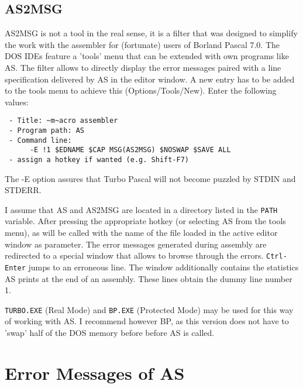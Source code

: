 \documentclass[12pt,twoside]{report}
\newcommand{\tty}[1]{{\tt #1}}
\begin{document}

\section{AS2MSG}

AS2MSG is not a tool in the real sense, it is a filter that was
designed to simplify the work with the assembler for (fortunate)
users of Borland Pascal 7.0.  The DOS IDEs feature a 'tools' menu
that can be extended with own programs like AS.  The filter allows to
directly display the error messages paired with a line
specification delivered by AS in the editor window.  A new entry has
to be added to the tools menu to achieve this (Options/Tools/New).
Enter the following values:
\begin{verbatim}
 - Title: ~m~acro assembler
 - Program path: AS
 - Command line: 
      -E !1 $EDNAME $CAP MSG(AS2MSG) $NOSWAP $SAVE ALL
 - assign a hotkey if wanted (e.g. Shift-F7)
\end{verbatim}
The -E option assures that Turbo Pascal will not become puzzled by
STDIN and STDERR.

I assume that AS and AS2MSG are located in a directory listed in the
\tty{PATH} variable.  After pressing the appropriate hotkey (or selecting
AS from the tools menu), as will be called with the name of the file
loaded in the active editor window as parameter.  The error messages
generated during assembly are redirected to a special window that
allows to browse through the errors.  \tty{Ctrl-Enter} jumps to an
erroneous line.  The window additionally contains the statistics AS
prints at the end of an assembly.  These lines obtain the dummy line
number 1.

\tty{TURBO.EXE} (Real Mode) and \tty{BP.EXE} (Protected Mode) may be used for
this way of working with AS.  I recommend however BP, as this version
does not have to 'swap' half of the DOS memory before before AS is
called. 

\appendix

\cleardoublepage
\chapter{Error Messages of AS}
\label{ChapErrMess}
\end{document}
